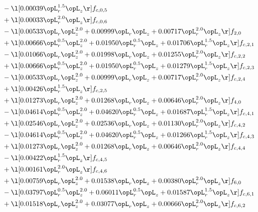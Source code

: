 \begin{alignat}{2}
& - \l[  0.00039 \opL_r^{1.5} \opL_z  \r] f_{c,0,5} \nonumber \\ 
& + \l[  0.00033 \opL_r^{2.0} \opL_z  \r] f_{c,0,6} \nonumber \\ 
& - \l[  0.00533 \opL_r \opL_z^{2.0} +  0.00999 \opL_r \opL_z +  0.00717 \opL_r^{2.0} \opL_z  \r] f_{2,0} \nonumber \\ 
& + \l[  0.00666 \opL_r^{0.5} \opL_z^{2.0} +  0.01950 \opL_r^{0.5} \opL_z +  0.01706 \opL_r^{1.5} \opL_z  \r] f_{c,2,1} \nonumber \\ 
& - \l[  0.01066 \opL_r \opL_z^{2.0} +  0.01998 \opL_r \opL_z +  0.01255 \opL_r^{2.0} \opL_z  \r] f_{c,2,2} \nonumber \\ 
& + \l[  0.00666 \opL_r^{0.5} \opL_z^{2.0} +  0.01950 \opL_r^{0.5} \opL_z +  0.01279 \opL_r^{1.5} \opL_z  \r] f_{c,2,3} \nonumber \\ 
& - \l[  0.00533 \opL_r \opL_z^{2.0} +  0.00999 \opL_r \opL_z +  0.00717 \opL_r^{2.0} \opL_z  \r] f_{c,2,4} \nonumber \\ 
& + \l[  0.00426 \opL_r^{1.5} \opL_z  \r] f_{c,2,5} \nonumber \\ 
& + \l[  0.01273 \opL_r \opL_z^{2.0} +  0.01268 \opL_r \opL_z +  0.00646 \opL_r^{2.0} \opL_z  \r] f_{4,0} \nonumber \\ 
& - \l[  0.04614 \opL_r^{0.5} \opL_z^{2.0} +  0.04620 \opL_r^{0.5} \opL_z +  0.01687 \opL_r^{1.5} \opL_z  \r] f_{c,4,1} \nonumber \\ 
& + \l[  0.02546 \opL_r \opL_z^{2.0} +  0.02536 \opL_r \opL_z +  0.01130 \opL_r^{2.0} \opL_z  \r] f_{c,4,2} \nonumber \\ 
& - \l[  0.04614 \opL_r^{0.5} \opL_z^{2.0} +  0.04620 \opL_r^{0.5} \opL_z +  0.01266 \opL_r^{1.5} \opL_z  \r] f_{c,4,3} \nonumber \\ 
& + \l[  0.01273 \opL_r \opL_z^{2.0} +  0.01268 \opL_r \opL_z +  0.00646 \opL_r^{2.0} \opL_z  \r] f_{c,4,4} \nonumber \\ 
& - \l[  0.00422 \opL_r^{1.5} \opL_z  \r] f_{c,4,5} \nonumber \\ 
& + \l[  0.00161 \opL_r^{2.0} \opL_z  \r] f_{c,4,6} \nonumber \\ 
& + \l[  0.00759 \opL_r \opL_z^{2.0} +  0.01538 \opL_r \opL_z +  0.00380 \opL_r^{2.0} \opL_z  \r] f_{6,0} \nonumber \\ 
& - \l[  0.03797 \opL_r^{0.5} \opL_z^{2.0} +  0.06011 \opL_r^{0.5} \opL_z +  0.01587 \opL_r^{1.5} \opL_z  \r] f_{c,6,1} \nonumber \\ 
& + \l[  0.01518 \opL_r \opL_z^{2.0} +  0.03077 \opL_r \opL_z +  0.00666 \opL_r^{2.0} \opL_z  \r] f_{c,6,2} \nonumber \\ 

\end{alignat}
